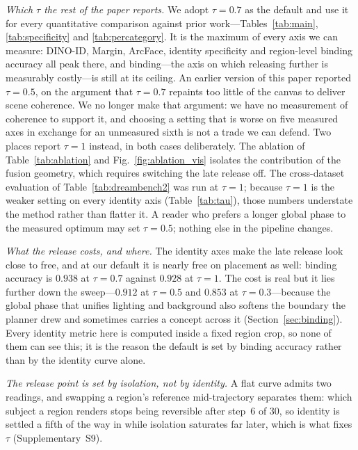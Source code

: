 \documentclass[review,10pt,times]{elsarticle}
\begin{document}
\noindent\textit{Which $\tau$ the rest of the paper reports.}
We adopt $\tau{=}0.7$ as the default and use it for every quantitative
comparison against prior work---Tables~\ref{tab:main},
\ref{tab:specificity} and \ref{tab:percategory}.  It is the maximum of every
axis we can measure: DINO-ID, Margin, ArcFace, identity specificity and
region-level binding accuracy all peak there, and binding---the axis on which
releasing further is measurably costly---is still at its ceiling.
An earlier version of this paper reported $\tau{=}0.5$, on the argument that
$\tau{=}0.7$ repaints too little of the canvas to deliver scene coherence.  We
no longer make that argument: we have no measurement of coherence to support
it, and choosing a setting that is worse on five measured axes in exchange for
an unmeasured sixth is not a trade we can defend.
Two places report $\tau{=}1$ instead, in both cases deliberately.  The ablation of
Table~\ref{tab:ablation} and Fig.~\ref{fig:ablation_vis} isolates the
contribution of the fusion geometry, which requires switching the late
release off.  The cross-dataset evaluation of
Table~\ref{tab:dreambench2} was run at $\tau{=}1$; because $\tau{=}1$ is
the weaker setting on every identity axis (Table~\ref{tab:tau}), those
numbers understate the method rather than flatter it.  A reader who prefers
a longer global phase to the measured optimum may set $\tau{=}0.5$; nothing
else in the pipeline changes.

\noindent\textit{What the release costs, and where.}
The identity axes make the late release look close to free, and at our default
it is nearly free on placement as well: binding accuracy is $0.938$ at $\tau{=}0.7$
against $0.928$ at $\tau{=}1$.  The cost is real but it lies further down the
sweep---$0.912$ at $\tau{=}0.5$ and $0.853$
at $\tau{=}0.3$---because the global phase that unifies lighting and
background also softens the boundary the planner drew and sometimes carries a
concept across it (Section~\ref{sec:binding}).  Every identity metric here is
computed inside a fixed region crop, so none of them can see this; it is the
reason the default is set by binding accuracy rather than by the identity
curve alone.

\noindent\textit{The release point is set by isolation, not by
identity.}
A flat curve admits two readings, and swapping a region's reference
mid-trajectory separates them: which subject a region renders stops being
reversible after step~6 of 30, so identity is settled a fifth of the way in
while isolation saturates far later, which is what fixes $\tau$
(Supplementary~S9).
\end{document}
